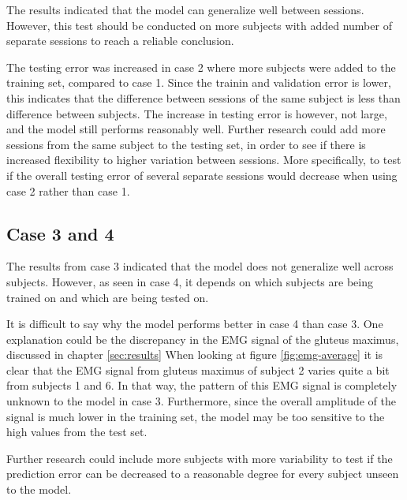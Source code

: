\documentclass[../main.tex]{subfiles}
\begin{document}
The results indicated that the model can generalize well between sessions.
However, this test should be conducted on more subjects with added number of separate sessions to reach a reliable conclusion.

The testing error was increased in case 2 where more subjects were added to the training set, compared to case 1.
Since the trainin and validation error is lower, this indicates that the difference between sessions of the same subject is less than difference between subjects.
The increase in testing error is however, not large, and the model still performs reasonably well.
Further research could add more sessions from the same subject to the testing set, in order to see if there is increased flexibility to higher variation between sessions.
More specifically, to test if the overall testing error of several separate sessions would decrease when using case 2 rather than case 1.

\subsection{Case 3 and 4}
\label{sec:discussion-case3and4}
The results from case 3 indicated that the model does not generalize well across subjects.
However, as seen in case 4, it depends on which subjects are being trained on and which are being tested on.

It is difficult to say why the model performs better in case 4 than case 3.
One explanation could be the discrepancy in the \ac{EMG} signal of the gluteus maximus, discussed in chapter \ref{sec:results}
When looking at figure \ref{fig:emg-average} it is clear that the \ac{EMG} signal from gluteus maximus of subject 2 varies quite a bit from subjects 1 and 6.
In that way, the pattern of this \ac{EMG} signal is completely unknown to the model in case 3.
Furthermore, since the overall amplitude of the signal is much lower in the training set, the model may be too sensitive to the high values from the test set.

Further research could include more subjects with more variability to test if the prediction error can be decreased to a reasonable degree for every subject unseen to the model.
\end{document}
